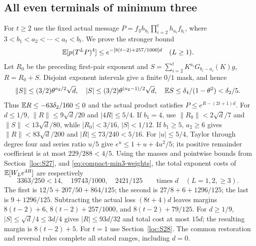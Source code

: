 \subsection{All even terminals of minimum three}\label{loc:S30}
For $t\ge2$ use the fixed actual message
$P=f_3h_{b_1}\prod_{i=2}^th_{a_i}f_{b_i}$,
where $3<b_1<a_2<\cdots<a_t<b_t$.
We prove the stronger bound
\[
 \mathbb E[p(T^LP)^4]\le e^{-[8(t-2)+257/1000]d}\quad(L\ge1).
\]
Let $R_0$ be the preceding first-pair exponent and
$S=\sum_{i=2}^tK^{a_i}G_{b_i-a_i}(K)g$, $R=R_0+S$.
Disjoint exponent intervals give a finite $0/1$ mask, and hence
\[
 \|S\|\le(3/2)\theta^{a_2/2}\sqrt d,\quad
 |S|\le(3/2)\theta^{(a_2-1)/2}\sqrt d,\quad
 \mathbb E S\le \delta_{4}/(1-\theta^2)<\delta_{2}/5.
\]
Thus $\mathbb E R\le-63\delta_{2}/160\le0$ and the actual product satisfies
$P\le e^{R-(2t+1)d}$.
For $d\le1/9$,
$\|R\|\le9\sqrt d/20$ and $|4R|\le5/4$.
If $b_1=4$, use $\|R_0\|<2\sqrt d/7$ and
$\|S\|<13\sqrt d/80$, while
$|R_0|<3/16$, $|S|<1/12$.
If $b_1\ge5$, $a_2\ge6$ gives
$\|R\|<83\sqrt d/200$ and $|R|\le73/240<5/16$.
For $|u|\le5/4$, Taylor through degree four and series ratio $u/5$
give $e^u\le1+u+4u^2/5$; its positive remainder coefficient is
at most $229/288<4/5$.
Using the masses and pointwise bounds from Section~\ref{loc:S27},
and \eqref{eq:compact-min3-weights}, the total exponent costs of
$\mathbb E[W_Le^{4R}]$ are respectively
\[
 3363/250<14,\quad19743/1000,\quad2421/125
 \qquad\text{times }d\quad(L=1,2,\ge3).
\]
The first is $12/5+207/50+864/125$;
the second is $27/8+6+1296/125$; the last is $9+1296/125$.
Subtracting the actual loss $(8t+4)d$ leaves margins
$8(t-2)+6$, $8(t-2)+257/1000$, and $8(t-2)+79/125$.
For $d\ge1/9$, $|S|\le\sqrt d/4\le3d/4$ gives
$|R|\le93d/32$ and total cost at most $15d$;
the resulting margin is $8(t-2)+5$.
For $t=1$ use Section~\ref{loc:S28}. The common restoration and reversal
rules complete all stated ranges, including $d=0$.

